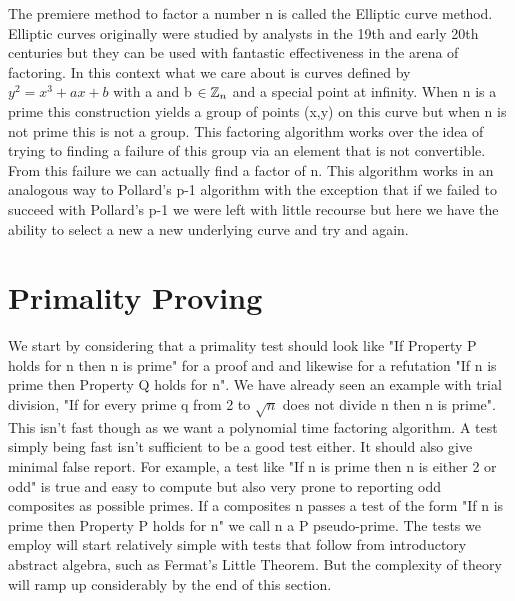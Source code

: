 \documentclass{article}
\begin{document}
The premiere method to factor a number n is called the Elliptic curve method.   Elliptic curves originally were studied by analysts in the 19th and early 20th centuries but they can be used with fantastic effectiveness in the arena of factoring. In this context what we care about is curves defined by $y^2 = x^3 + ax + b$ with a and b $\in \mathbb{Z} _n$ and a special point at infinity. When n is a prime this construction yields a group of points (x,y) on this curve but when n is not prime this is not a group. This factoring algorithm works over the idea of trying to finding a failure of this group via an element that is not convertible. From this failure we can actually find a factor of n. This algorithm works in an analogous way to Pollard's p-1 algorithm with the exception that if we failed to succeed with Pollard's p-1 we were left with little recourse but here we have the ability to select a new a new underlying curve and try and again. 
 
 
\section{Primality Proving}
We start by considering that a primality test should look like "If Property P holds for n then n is prime"  for a proof and and likewise for a  refutation "If n is prime then Property Q holds for n".  We have already seen an example with trial division, "If for every prime q from 2 to $\sqrt{n}$ does not divide n  then n is prime". This isn't fast though as we want a polynomial time factoring algorithm. A test simply being fast isn't sufficient to be a good test either. It should also give minimal false report. For example, a test like "If n is prime then n is either 2 or odd" is true and easy to compute but also very prone to reporting odd composites as possible primes.  If a composites n passes a test of the form "If n is prime then Property P holds for n" we call n a P pseudo-prime. The tests we employ will start relatively simple with tests that follow from introductory abstract algebra, such as Fermat's Little Theorem. But the complexity of theory will ramp up considerably by the end of this section. 
\end{document}
